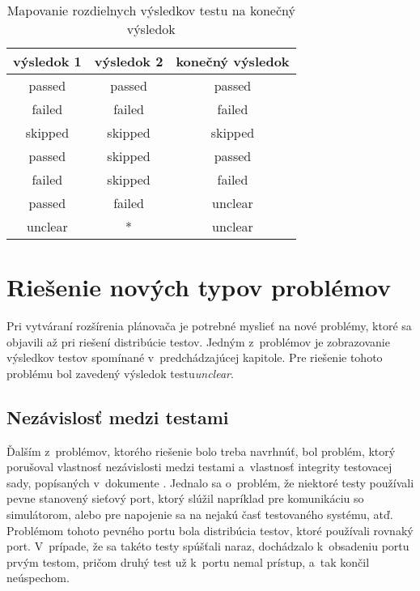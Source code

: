 \begin{table}
  \begin{center}
    \begin{tabular}{| c | c | c |}
    \hline
    výsledok 1  & výsledok 2 & konečný výsledok \\ \hline
    passed      & passed     & passed  \\ \hline
    failed      & failed     & failed  \\ \hline
    skipped     & skipped    & skipped \\ \hline
    passed      & skipped    & passed  \\ \hline
    failed      & skipped    & failed  \\ \hline
    passed      & failed     & unclear \\ \hline
    unclear     &      *     & unclear \\ 
    \hline
    \end{tabular}
    \label{tabulka:vysledky_testu_prevod}
    \caption{Mapovanie rozdielnych výsledkov testu na konečný výsledok}
  \end{center}
\end{table}



\section{Riešenie nových typov problémov}
\label{sekcia:riesenie_novych_problemov}
Pri vytváraní rozšírenia plánovača je potrebné myslieť na nové problémy, ktoré sa objavili
až pri riešení distribúcie testov. Jedným z~problémov je zobrazovanie výsledkov testov spomínané v~predchádzajúcej kapitole.
Pre riešenie tohoto problému bol zavedený výsledok testu\emph{unclear}.

\subsection*{Nezávislosť medzi testami}
Ďalším z~problémov, ktorého riešenie bolo treba navrhnúť, bol problém, ktorý porušoval vlastnosť nezávislosti 
medzi testami a~vlastnosť integrity testovacej sady, popísaných v~dokumente \cite{Kapfhammer}.
Jednalo sa o~problém, že niektoré testy používali pevne stanovený sieťový port, ktorý slúžil napríklad pre
komunikáciu so simulátorom, alebo pre napojenie sa na nejakú časť testovaného systému, atď.
Problémom tohoto pevného portu bola distribúcia testov, ktoré používali rovnaký port.
V~prípade, že sa takéto testy spúšťali naraz, dochádzalo k~obsadeniu portu prvým testom, pričom druhý test 
už k~portu nemal prístup, a~tak končil neúspechom.

